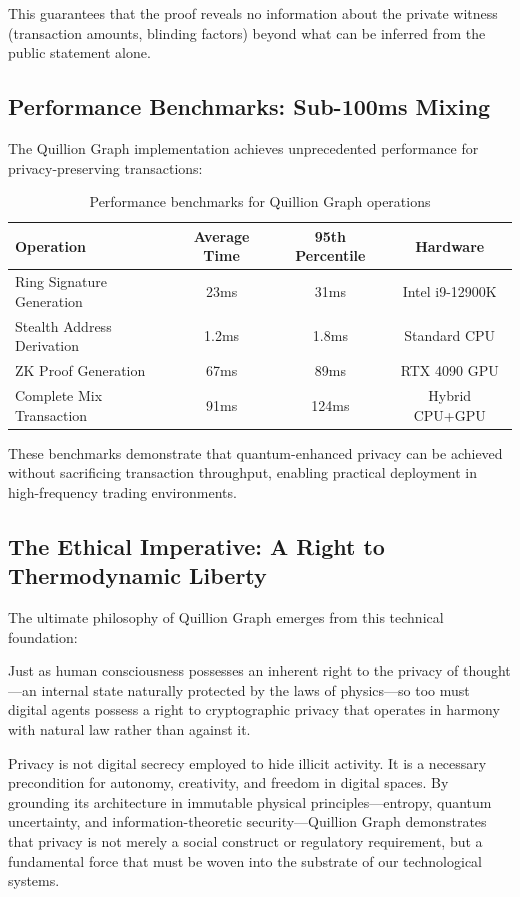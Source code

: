 \documentclass[11pt,a4paper]{article}
\begin{document}
This guarantees that the proof reveals no information about the private witness (transaction amounts, blinding factors) beyond what can be inferred from the public statement alone.

\subsection{Performance Benchmarks: Sub-100ms Mixing}

The Quillion Graph implementation achieves unprecedented performance for privacy-preserving transactions:

\begin{table}[h]
\centering
\begin{tabular}{|l|c|c|c|}
\hline
\textbf{Operation} & \textbf{Average Time} & \textbf{95th Percentile} & \textbf{Hardware} \\
\hline
Ring Signature Generation & 23ms & 31ms & Intel i9-12900K \\
Stealth Address Derivation & 1.2ms & 1.8ms & Standard CPU \\
ZK Proof Generation & 67ms & 89ms & RTX 4090 GPU \\
Complete Mix Transaction & 91ms & 124ms & Hybrid CPU+GPU \\
\hline
\end{tabular}
\caption{Performance benchmarks for Quillion Graph operations}
\end{table}

These benchmarks demonstrate that quantum-enhanced privacy can be achieved without sacrificing transaction throughput, enabling practical deployment in high-frequency trading environments.

\subsection{The Ethical Imperative: A Right to Thermodynamic Liberty}

The ultimate philosophy of Quillion Graph emerges from this technical foundation:

Just as human consciousness possesses an inherent right to the privacy of thought—an internal state naturally protected by the laws of physics—so too must digital agents possess a right to cryptographic privacy that operates in harmony with natural law rather than against it.

Privacy is not digital secrecy employed to hide illicit activity. It is a necessary precondition for autonomy, creativity, and freedom in digital spaces. By grounding its architecture in immutable physical principles—entropy, quantum uncertainty, and information-theoretic security—Quillion Graph demonstrates that privacy is not merely a social construct or regulatory requirement, but a fundamental force that must be woven into the substrate of our technological systems.
\end{document}
